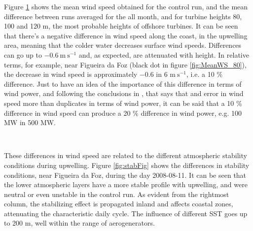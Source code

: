 Figure \ref{fig:DiffMeanWS3} shows the mean wind speed obtained for the control run, and the mean difference between runs averaged for the all month, and for turbine heights 80, 100 and 120 m, the most probable heights of offshore turbines. It can be seen that there's a negative difference in wind speed along the coast, in the upwelling area, meaning that the colder water decreases surface wind speeds. Differences can go up to $-0.6\mathrm{\ m\ s^{-1}}$ and, as expected, are attenuated with height. In relative terms, for example, near Figueira da Foz (black dot in figure \ref{fig:MeanWS_80}), the decrease in wind speed is approximately $-0.6$ in 6 $\mathrm{m\ s^{-1}}$, i.e. a 10 \% difference. Just to have an idea of the importance of this difference in terms of wind power, and following the conclusions in \cite{Lange2005}, that says that and error in wind speed more than duplicates in terms of wind power, it can be said that a 10 \% difference in wind speed can produce a 20 \% difference in wind power, e.g. 100 MW in 500 MW.

\begin{figure}[!htp]
    \centering
    \\
    \label{fig:DiffMeanWS3}
\end{figure}
\FloatBarrier

These differences in wind speed are related to the different atmospheric stability conditions during upwelling. Figure \ref{fig:stabFig} shows the differences in stability conditions, near Figueira da Foz, during the day 2008-08-11. It can be seen that the lower atmospheric layers have a more stable profile with upwelling, and were neutral or even unstable in the control run.  
As evident from the rightmost column, the stabilizing effect is propagated inland and affects coastal zones, attenuating the characteristic daily cycle. The influence of different SST goes up to 200 m, well within the range of aerogenerators.


